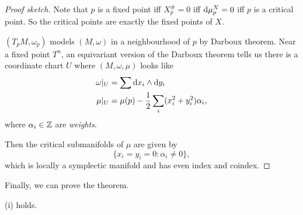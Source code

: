 \documentclass[a4paper]{article}
\DeclareMathOperator{\Symp}{Symp}
\begin{document}
\begin{proof}[Proof sketch]
  Note that $p$ is a fixed point iff $X^\#_p = 0$ iff $\mathrm{d} \mu^X_p = 0$ iff $p$ is a critical point. So the critical points are exactly the fixed points of $X$.

  $(T_p M, \omega_p)$ models $(M, \omega)$ in a neighbourhood of $p$ by Darboux theorem. Near a fixed point $T^n$, an equivariant version of the Darboux theorem tells us there is a coordinate chart $U$ where $(M, \omega, \mu)$ looks like
  \begin{align*}
    \omega|_U &= \sum \mathrm{d} x_i \wedge \mathrm{d} y_i\\
    \mu|_U &= \mu(p) - \frac{1}{2} \sum_i (x_i^2 + y_i^2) \alpha_i,
  \end{align*}
  where $\alpha_i \in \mathbb{Z}$ are \emph{weights}.

  Then the critical submanifolds of $\mu$ are given by
  \[
     \{x_i = y_i = 0 : \alpha_i \not= 0\},
  \]
  which is locally a symplectic manifold and has even index and coindex.
\end{proof}

%
Finally, we can prove the theorem.
\begin{lemma}
  (i) holds.
\end{lemma}
\end{document}
